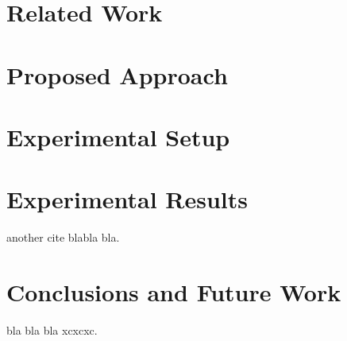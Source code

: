\documentclass[runningheads,a4paper]{llncs}
\begin{document}

\section{Related Work}




\section{Proposed Approach}




\section{Experimental Setup}



\section{Experimental Results}

another cite \cite{AbdelkaderLahmadi2005} blabla bla.


\section{Conclusions and Future Work}
bla bla bla \cite{pat11} xcxcxc.
\end{document}
